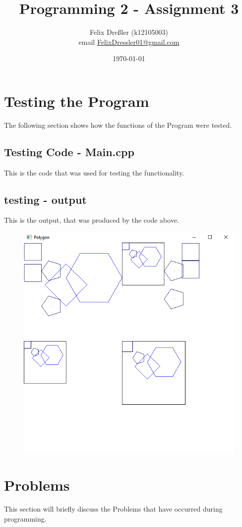 \documentclass[11pt,titlepage]{article}
\title{Programming 2 - Assignment 3}
\author{Felix Dreßler (k12105003)\\ email \href{mailto:FelixDressler01@gmail.com}{FelixDressler01@gmail.com}}
\date{\today} %
\begin{document}
\maketitle
	\section{Testing the Program}
		The following section shows how the functions of the Program were tested.
		\subsection{Testing Code - Main.cpp}
			This is the code that was used for testing the functionality.
			
\newpage
		\subsection{testing - output}
			This is the output, that was produced by the code above.
			\begin{figure}[h]
				\centering
				\includegraphics[scale=0.75]{Documentation/Testing/test1.png}
			\end{figure}

\newpage			
	\section{Problems}
	This section will briefly discuss the Problems that have occurred during programming.
\end{document}
